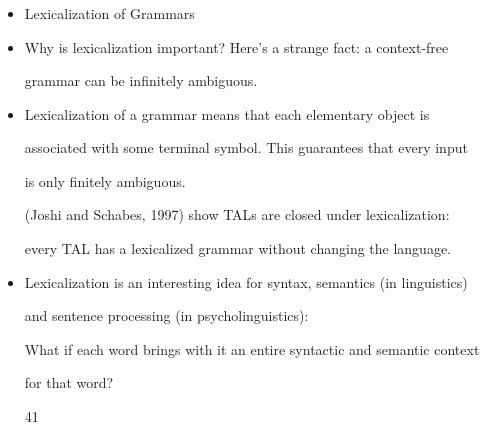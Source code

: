 \documentclass[compress,color=usenames]{beamer}
\begin{document}
\begin{frame}
\frametitle{}

\begin{itemize}
\item

Lexicalization of Grammars





\item Why is lexicalization important? Here's a strange fact: a context-free


grammar can be inﬁnitely ambiguous.





\item Lexicalization of a grammar means that each elementary object is


associated with some terminal symbol. This guarantees that every input


is only ﬁnitely ambiguous.


(Joshi and Schabes, 1997) show TALs are closed under lexicalization:


every TAL has a lexicalized grammar without changing the language.





\item Lexicalization is an interesting idea for syntax, semantics (in linguistics)


and sentence processing (in psycholinguistics):


What if each word brings with it an entire syntactic and semantic context


for that word?


41




\end{itemize}

\end{frame}
\end{document}
